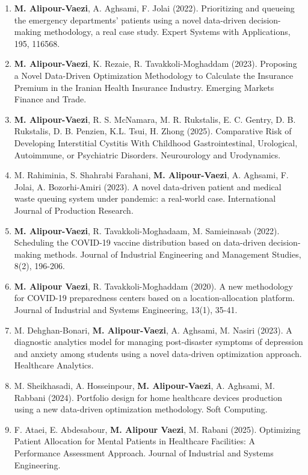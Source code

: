 \documentclass[9pt,a4paper]{extarticle}
\newcommand{\BodyFont}
    {\fontsize{8.5}{9.30}\selectfont}
\newenvironment{cvcatlist}{%
    \begin{itemize}[
        leftmargin=0pt,
        labelsep=0pt,
        label={},
        topsep=0pt,
        itemsep=-0.5pt,
        parsep=0pt,
        partopsep=0pt
    ]
}{%
    \end{itemize}
}
\newenvironment{cvsublist}{%
    \begin{enumerate}[
        leftmargin=0.24in,
        labelsep=0.04in,
        label={\BodyFont\color{CVBody}\arabic*.},
        start=1,
        topsep=-0.8pt,
        itemsep=-0.8pt,
        parsep=0pt,
        partopsep=0pt
    ]
}{%
    \end{enumerate}
}
\newcommand{\pubitem}[1]{%
    \item\relax
    {\BodyFont\color{CVBody}\ignorespaces#1\unskip}%
}
\begin{document}
\begin{cvcatlist}
\begin{cvsublist}
\pubitem{
\textbf{M. Alipour-Vaezi},
A. Aghsami,
F. Jolai
(2022).
Prioritizing and queueing the emergency departments’ patients
using a novel data-driven decision-making methodology,
a real case study.
Expert Systems with Applications, 195, 116568.
}

\pubitem{
\textbf{M. Alipour-Vaezi},
K. Rezaie,
R. Tavakkoli-Moghaddam
(2023).
Proposing a Novel Data-Driven Optimization Methodology
to Calculate the Insurance Premium
in the Iranian Health Insurance Industry.
Emerging Markets Finance and Trade.
}

\pubitem{
\textbf{M. Alipour-Vaezi},
R. S. McNamara,
M. R. Rukstalis,
E. C. Gentry,
D. B. Rukstalis,
D. B. Penzien,
K.L. Tsui,
H. Zhong
(2025).
Comparative Risk of Developing Interstitial Cystitis
With Childhood Gastrointestinal, Urological,
Autoimmune, or Psychiatric Disorders.
Neurourology and Urodynamics.
}

\pubitem{
M. Rahiminia,
S. Shahrabi Farahani,
\textbf{M. Alipour-Vaezi},
A. Aghsami,
F. Jolai,
A. Bozorhi-Amiri
(2023).
A novel data-driven patient and medical waste queuing system
under pandemic:
a real-world case.
International Journal of Production Research.
}

\pubitem{
\textbf{M. Alipour-Vaezi},
R. Tavakkoli-Moghadaam,
M. Samieinasab
(2022).
Scheduling the COVID-19 vaccine distribution
based on data-driven decision-making methods.
Journal of Industrial Engineering and Management Studies,
8(2), 196-206.
}

\pubitem{
\textbf{M. Alipour Vaezi},
R. Tavakkoli-Moghaddam
(2020).
A new methodology for COVID-19 preparedness centers
based on a location-allocation platform.
Journal of Industrial and Systems Engineering,
13(1), 35-41.
}

\pubitem{
M. Dehghan-Bonari,
\textbf{M. Alipour-Vaezi},
A. Aghsami,
M. Nasiri
(2023).
A diagnostic analytics model for managing post-disaster symptoms
of depression and anxiety among students
using a novel data-driven optimization approach.
Healthcare Analytics.
}

\pubitem{
M. Sheikhasadi,
A. Hosseinpour,
\textbf{M. Alipour-Vaezi},
A. Aghsami,
M. Rabbani
(2024).
Portfolio design for home healthcare devices production
using a new data-driven optimization methodology.
Soft Computing.
}

\pubitem{
F. Ataei,
E. Abdesabour,
\textbf{M. Alipour Vaezi},
M. Rabani
(2025).
Optimizing Patient Allocation for Mental Patients
in Healthcare Facilities:
A Performance Assessment Approach.
Journal of Industrial and Systems Engineering.
}


\end{cvsublist}
\end{cvcatlist}
\end{document}
